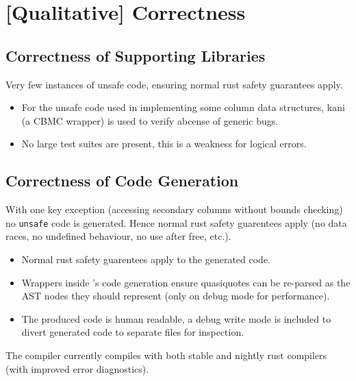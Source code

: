 \section{[Qualitative] Correctness}
\subsection{Correctness of Supporting Libraries}
Very few instances of unsafe code, ensuring normal rust safety guarantees apply.
\begin{itemize}
    \setlength\itemsep{0em}
    \item For the unsafe code used in implementing some column data structures, kani\cite{KaniGithub} (a CBMC\cite{DiffBlueCBMC} wrapper) is used to verify abcense of generic bugs.
    \item No large test suites are present, this is a weakness for logical errors.
\end{itemize}

\subsection{Correctness of Code Generation}
With one key exception (accessing secondary columns without bounds checking) no \texttt{unsafe} code is generated. Hence normal rust safety guarentees apply (no data races, no undefined behaviour, no use after free, etc.).
\begin{itemize}
    \setlength\itemsep{0em}
    \item Normal rust safety guarentees apply to the generated code.
    \item Wrappers inside \emdb's code generation ensure quasiquotes can be re-parsed as the AST nodes they should represent (only on debug mode for performance).
    \item The produced code is human readable, a debug write mode is included to divert generated code to separate files for inspection.
\end{itemize}

The \emdb compiler currently compiles with both stable and nightly rust compilers (with improved error diagnostics).

